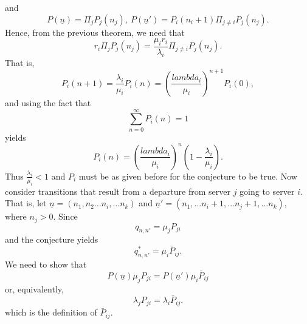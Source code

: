 \documentclass[a4paper,10pt]{article}
\begin{document}
 and 
 \begin{equation*}
 P(\underline{n})=\Pi_j P_j(n_j),~ P(\underline{n}')=P_i(n_i+1)\Pi_{j \neq i}P_j(n_j).
 \end{equation*}
 Hence, from the previous theorem, we need that
 \begin{equation*}
  r_i \Pi_j P_j(n_j)= \frac{\mu_i r_i}{\lambda_i}\Pi_{j \neq i}P_j(n_j).
 \end{equation*} 
 That is,
 \begin{equation*}
 P_i(n+1)= \frac{\lambda_i}{\mu_i}P_i(n)={(\frac{lambda_i}{\mu_i})}^{n+1}P_i(0),
 \end{equation*}
 and using the fact that 
 \begin{equation*}
\sum_{n=0}^{\infty}P_i(n)=1
 \end{equation*}
 yields 
 \begin{equation*}
P_i(n) ={(\frac{lambda_i}{\mu_i})}^n(1-\frac{\lambda_i}{\mu_i}).
\end{equation*}
Thus $\frac{\lambda_i}{\mu_i}< 1$ and $P_i$ must be as given before for the conjecture to be true. Now consider transitions that result from a departure from server $j$ going to server $i$. That is, let $\underline{n}=(n_1,n_2 \hdots n_i, \hdots n_k)$ and $\underline{n}'=(n_1,\hdots n_i+1,\hdots n_j+1,\hdots n_k)$, where $n_j >0$. Since
\begin{equation*}
q_{n,n'}=\mu_j P_{ji}
\end{equation*}
and the conjecture yields
\begin{equation*}
q_{n,n'}^*=\mu_i \bar{P}_{ij}.
\end{equation*}
We need to show that 
\begin{equation*}
P(\underline{n})\mu_j P_{ji}= P(\underline{n}')\mu_i \bar{P}_{ij}
\end{equation*}
or, equivalently,
\begin{equation*}
\lambda_j P_{ji}=\lambda_i \bar{P}_{ij}.
\end{equation*}
which is the definition of $\bar{P}_{ij}$.
\end{document}
